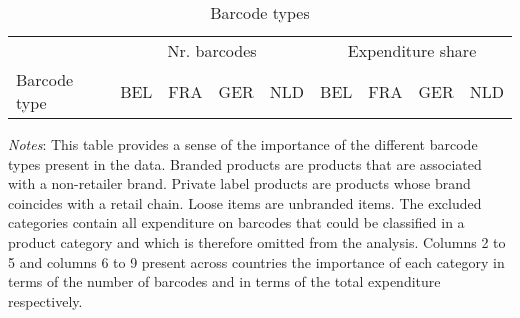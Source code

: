 \begin{table}[H]
	\centering
	\caption{Barcode types}
    \label{tab: app_bars_firms_barcode_type}
	\begin{spacing}{1.1}
        \begin{tabular}{lrrrrrrrr} \toprule
			& \multicolumn{4}{c}{Nr. barcodes} & \multicolumn{4}{c}{Expenditure share} \\ 
                \cmidrule(lr){2-5} \cmidrule(lr){6-9}
		    Barcode type & BEL & FRA & GER & NLD & BEL & FRA & GER & NLD \\ \midrule
		    
	    \end{tabular}
    \end{spacing}
    \parbox{\textwidth}{
	\begin{spacing}{1} 
		{\footnotesize 
		\textit{Notes}: This table provides a sense of the importance of the different barcode types present in the data. Branded products are products that are associated with a non-retailer brand. Private label products are products whose brand coincides with a retail chain. Loose items are unbranded items. The excluded categories contain all expenditure on barcodes that could be classified in a product category and which is therefore omitted from the analysis. Columns 2 to 5 and columns 6 to 9 present across countries the importance of each category in terms of the number of barcodes and in terms of the total expenditure respectively.} 
	\end{spacing}}
\end{table}

